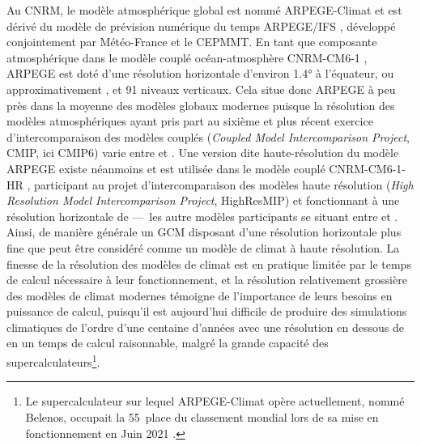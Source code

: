 \documentclass[../main.tex]{subfiles}
\begin{document}
Au CNRM, le modèle atmosphérique global est nommé ARPEGE-Climat \parencite[Action de Recherche Petite Échelle Grande Échelle,][]{deque_arpege_1994} et est
dérivé du modèle de prévision numérique du temps ARPEGE/IFS \parencite[\textit{Integrated Forecast System},][]{courtier_arpege_1991}, développé conjointement
par Météo-France et le CEPMMT. En tant que composante atmosphérique dans le modèle couplé océan-atmosphère \nolinebreak CNRM-CM6-1
\parencite{voldoire_evaluation_2019}, ARPEGE est doté d'une résolution horizontale d'environ \ang{1.4} à l'équateur, ou approximativement , et \num{91}
niveaux verticaux. Cela situe donc ARPEGE à peu près dans la moyenne des modèles globaux modernes puisque la résolution des modèles atmosphériques ayant pris
part au sixième et plus récent exercice d'intercomparaison des modèles couplés (\textit{Coupled Model Intercomparison Project}, CMIP, ici CMIP6)
\parencite{eyring_overview_2016} varie entre  et  \parencite[][Tableau AII.5]{ipcc_annex_2021}. Une version dite haute-résolution du modèle
ARPEGE existe néanmoins et est utilisée dans le modèle couplé CNRM-CM6-1-HR \parencite{saint-martin_tracking_2021}, participant au projet d'intercomparaison des
modèles haute résolution (\textit{High Resolution Model Intercomparison Project}, HighResMIP) \parencite{haarsma_high_2016} et fonctionnant à une résolution
horizontale de  ---~les autre modèles participants se situant entre  et  \parencite[][Tableau AII.6]{ipcc_annex_2021}. Ainsi, de manière
générale un GCM disposant d'une résolution horizontale plus fine que  peut être considéré comme un modèle de climat à haute résolution. La finesse de la
résolution des modèles de climat est en pratique limitée par le temps de calcul nécessaire à leur fonctionnement, et la résolution relativement grossière des
modèles de climat modernes témoigne de l'importance de leurs besoins en puissance de calcul, puisqu'il est aujourd'hui difficile de produire des simulations
climatiques de l'ordre d'une centaine d'années avec une résolution en dessous de  en un temps de calcul raisonnable, malgré la grande capacité des
supercalculateurs\footnote{Le supercalculateur sur lequel ARPEGE-Climat opère actuellement, nommé Belenos, occupait la \num{55}\ieme~place du classement mondial
lors de sa mise en fonctionnement en Juin \num{2021} \parencite{belenos_top500}.}.
\end{document}
